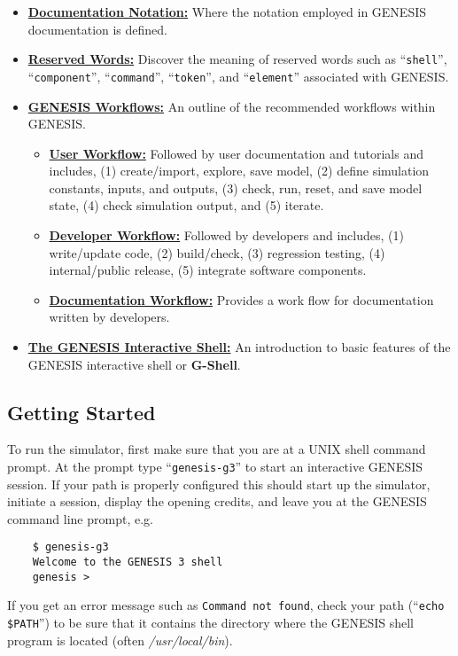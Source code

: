 \documentclass[12pt]{article}
\begin{document}
\begin{itemize}

\item \href{../document-notation/document-notation.tex}{\bf Documentation Notation:} Where the notation employed in GENESIS documentation is defined.

\item \href{../reserved-words/reserved-words.tex}{\bf Reserved Words:} Discover the meaning of reserved words such as ``{\tt shell}'', ``{\tt component}'', ``{\tt command}'', ``{\tt token}'', and ``{\tt element}'' associated with GENESIS.

\item \href{../workflow-intro/workflow-intro.tex}{\bf GENESIS Workflows:} An outline of the recommended workflows within GENESIS.
\begin{itemize}
\item \href{../workflow-user/workflow-user.tex}{\bf User Workflow:} Followed by user documentation and tutorials and includes, (1) create/import, explore, save model, (2) define simulation constants, inputs, and outputs, (3) check, run, reset, and save model state, (4) check simulation output, and (5) iterate.
\item \href{../workflow-developer/workflow-developer.tex}{\bf Developer Workflow:} Followed by developers and includes, (1) write/update code, (2) build/check, (3) regression testing, (4) internal/public release, (5) integrate software components.
\item \href{../workflow-documentation/workflow-documentation.tex}{\bf Documentation Workflow:} Provides a work flow for documentation written by developers.
\end{itemize}

\item \href{../gshell/gshell.tex}{\bf The GENESIS Interactive Shell:} An introduction to basic features of the GENESIS interactive shell or {\bf G-Shell}.

\end{itemize}

\subsection*{Getting Started}

To run the simulator, first make sure that you are at a UNIX shell command prompt. At the prompt type ``{\tt genesis-g3}'' to start an interactive GENESIS session. If your path is properly configured this should start up the simulator, initiate a session, display the opening credits, and leave you at the GENESIS command line prompt, e.g.
\begin{verbatim}
    $ genesis-g3
    Welcome to the GENESIS 3 shell
    genesis >
\end{verbatim}
If you get an error message such as {\tt Command not found}, check your path (``{\tt echo \$PATH}'') to be sure that it contains the directory where the GENESIS shell program is located (often {\it /usr/local/bin}).
\end{document}
